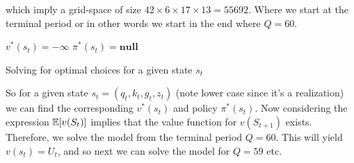 which imply a grid-space of size $42 \times 6 \times 17 \times 13 = 55692$. Where we start at the terminal period or in other words we start in the end where $Q=60$. 


\begin{algorithm}[H]
\SetAlgoLined
{}
  $v^{*}(s_t) = - \infty$\;
  $\pi^*(s_t) = \textbf{null}$\;
 \caption{Solving for optimal choices for a given state $s_t$}
\end{algorithm}

So for a given state $s_t=(q_t, k_t, g_t, z_t)$ (note lower case since it's a realization) we can find the corresponding $v^*(s_t)$ and policy $\pi^*(s_t)$. Now considering the expression $\mathbb{E} [v(S_t)]$ implies that the value function for $v(S_{t+1})$ exists. Therefore, we solve the model from the terminal period $Q=60$. This will yield $v(s_t) = U_t$, and so next we can solve the model for $Q=59$ etc.


